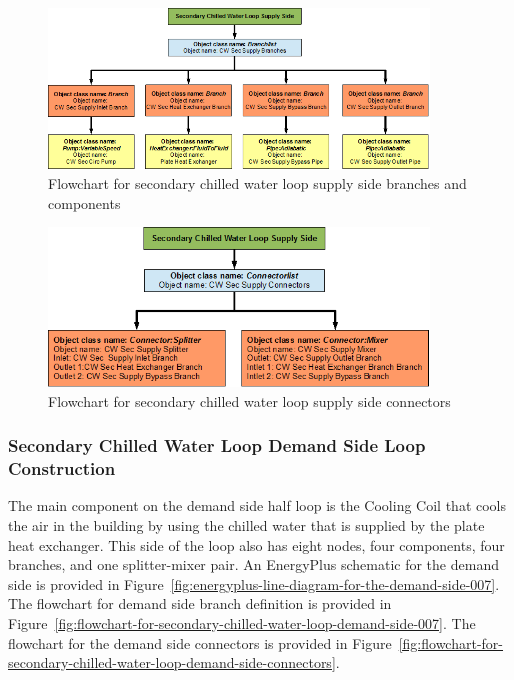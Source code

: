 \begin{figure}[hbtp] %
\centering
\includegraphics[width=0.9\textwidth, height=0.9\textheight, keepaspectratio=true]{media/image107.png}
\caption{Flowchart for secondary chilled water loop supply side branches and components \protect \label{fig:flowchart-for-secondary-chilled-water-loop-supply-side-007}}
\end{figure}

\begin{figure}[hbtp] %
\centering
\includegraphics[width=0.9\textwidth, height=0.9\textheight, keepaspectratio=true]{media/image108.png}
\caption{Flowchart for secondary chilled water loop supply side connectors \protect \label{fig:flowchart-for-secondary-chilled-water-loop-supply-side-connectors}}
\end{figure}

\subsubsection{Secondary Chilled Water Loop Demand Side Loop Construction}\label{secondary-chilled-water-loop-demand-side-loop-construction}

The main component on the demand side half loop is the Cooling Coil that cools the air in the building by using the chilled water that is supplied by the plate heat exchanger. This side of the loop also has eight nodes, four components, four branches, and one splitter-mixer pair. An EnergyPlus schematic for the demand side is provided in Figure~\ref{fig:energyplus-line-diagram-for-the-demand-side-007}. The flowchart for demand side branch definition is provided in Figure~\ref{fig:flowchart-for-secondary-chilled-water-loop-demand-side-007}. The flowchart for the demand side connectors is provided in Figure~\ref{fig:flowchart-for-secondary-chilled-water-loop-demand-side-connectors}.

